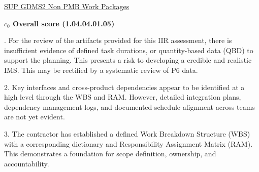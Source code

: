 % 


\begin{frame}{\href{run:../local/source-docs/1.04.04.01.05.pdf}{SUP GDMS2 Non PMB Work Packages}}
\centering
{}
\par
\vspace{0.75em}
\textbf{\small{\(c_0\) Overall score {\tiny (1.04.04.01.05)}}}\\\par
\vspace{0.5em}
\begin{minipage}{0.85\textwidth}
\raggedright
\fontsize{7}{9}. For the review of the artifacts provided for this IIR assessment, there is insufficient evidence of defined task durations, or quantity-based data (QBD) to support the planning. This presents a risk to developing a credible and realistic IMS. This may be rectified by a systematic review of P6 data.\par\vspace{0.5em}2. Key interfaces and cross-product dependencies appear to be identified at a high level through the WBS and RAM. However, detailed integration plans, dependency management logs, and documented schedule alignment across teams are not yet evident.\par\vspace{0.5em}3. The contractor has established a defined Work Breakdown Structure (WBS) with a corresponding dictionary and Responsibility Assignment Matrix (RAM). This demonstrates a foundation for scope definition, ownership, and accountability.\par
\end{minipage}
\end{frame}
